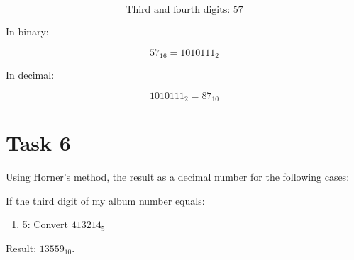 \documentclass{article}
\begin{document}
\[
\text{Third and fourth digits: } 57
\]

In binary:

\[
57_{16} = 1010111_2
\]

In decimal:

\[
1010111_2 = 87_{10}
\]
\section*{Task 6}
Using Horner's method, the result as a decimal number for the following cases:

If the third digit of my album number equals:

\begin{enumerate}
    \item 5: Convert \( 413214_5 \)
\end{enumerate}

Result: \( 13559_{10} \).
\end{document}
